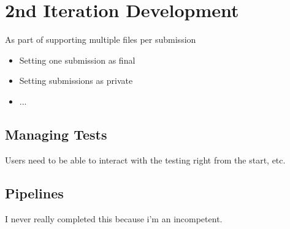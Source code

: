 \documentclass[a4paper,11pt]{report}
\begin{document}
\section{2nd Iteration Development}
As part of supporting multiple files per submission
\begin{itemize}
\item Setting one submission as final
\item Setting submissions as private
\item ...
\end{itemize}
\subsection{Managing Tests}
Users need to be able to interact with the testing right from the start, etc.
\subsection{Pipelines}
I never really completed this because i'm an incompetent.
\end{document}
